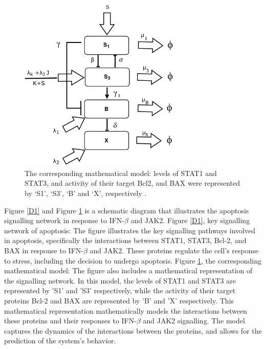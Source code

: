  \begin{figure}[hbt!]
	\centering
	\begin{framed}
	\includegraphics[width=0.7\textwidth]{Figures/D2.pdf}
		\end{framed}
	\caption{The corresponding mathematical model: levels of STAT1 and STAT3, and activity of their target Bcl2, and BAX were represented by ‘S1’, ‘S3’, ‘B’ and ‘X’, respectively \cite{lee2021mathematical}.}
	\label{D2}
\end{figure}

Figure \ref{D1} and Figure \ref{D2} is a schematic diagram that illustrates the apoptosis signalling network in response to IFN-$\beta$ and JAK2. Figure \ref{D1}, key signalling network of apoptosis: The figure illustrates the key signalling pathways involved in apoptosis, specifically the interactions between STAT1, STAT3, Bcl-2, and BAX in response to IFN-$\beta$ and JAK2. These proteins regulate the cell's response to stress, including the decision to undergo apoptosis. Figure \ref{D2},
the corresponding mathematical model: The figure also includes a mathematical representation of the signalling network. In this model, the levels of STAT1 and STAT3 are represented by 'S1' and 'S3' respectively, while the activity of their target proteins Bcl-2 and BAX are represented by 'B' and 'X' respectively. This mathematical representation mathematically models the interactions between these proteins and their responses to IFN-$\beta$ and JAK2 signalling. The model captures the dynamics of the interactions between the proteins, and allows for the prediction of the system's behavior.

